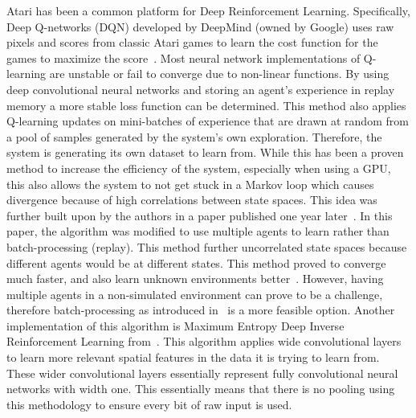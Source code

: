 \documentclass[12pt,american]{report}
\begin{document}
	Atari has been a common platform for Deep Reinforcement Learning. Specifically, Deep Q-networks (DQN) developed by DeepMind (owned by Google) uses raw pixels and scores from classic Atari games to learn the cost function for the games to maximize the score~\cite{mnih2015human}. Most neural network implementations of Q-learning are unstable or fail to converge due to non-linear functions. By using deep convolutional neural networks and storing an agent's experience in replay memory a more stable loss function can be determined.   This method also applies Q-learning updates on mini-batches of experience that are drawn at random from a pool of samples generated by the system's own exploration. Therefore, the system is generating its own dataset to learn from. While this has been a proven method to increase the efficiency of the system, especially when using a GPU, this also allows the system to not get stuck in a Markov loop which causes divergence because of high correlations between state spaces.  This idea was further built upon by the authors in a paper published one year later~\cite{mnih2016asynchronous}. In this paper, the algorithm was modified to use multiple agents to learn rather than batch-processing (replay). This method further uncorrelated state spaces because different agents would be at different states. This method proved to converge much faster, and also learn unknown environments better~\cite{mnih2016asynchronous}. However, having multiple agents in a non-simulated environment can prove to be a challenge, therefore batch-processing as introduced in~\cite{mnih2015human} is a more feasible option. Another implementation of this algorithm is Maximum Entropy Deep Inverse Reinforcement Learning from~\cite{wulfmeier2015maximum}. This algorithm applies wide convolutional layers to learn more relevant spatial features in the data it is trying to learn from. These wider convolutional layers essentially represent fully convolutional neural networks with width one. This essentially means that there is no pooling using this methodology to ensure every bit of raw input is used. 

\end{document}
